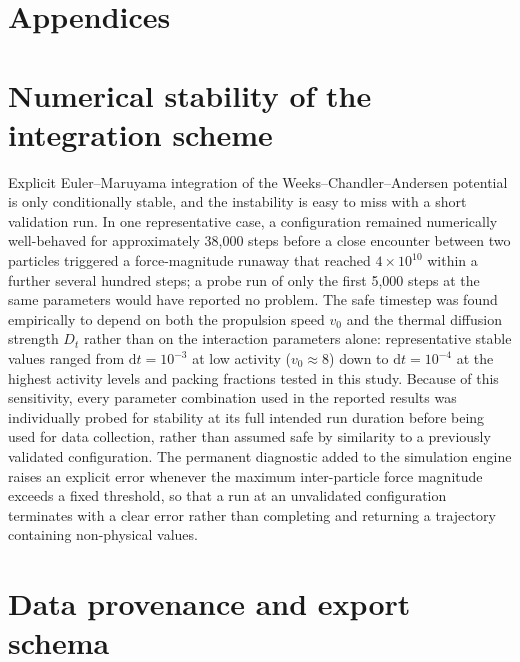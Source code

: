 \documentclass[11pt]{article}
\begin{document}
\newpage
\section*{Appendices}

\appendix

\section{Numerical stability of the integration scheme}
\label{app:stability}

Explicit Euler--Maruyama integration of the Weeks--Chandler--Andersen potential is only conditionally stable, and the instability is easy to miss with a short validation run. In one representative case, a configuration remained numerically well-behaved for approximately 38{,}000 steps before a close encounter between two particles triggered a force-magnitude runaway that reached $4\times10^{10}$ within a further several hundred steps; a probe run of only the first 5{,}000 steps at the same parameters would have reported no problem. The safe timestep was found empirically to depend on both the propulsion speed $v_0$ and the thermal diffusion strength $D_t$ rather than on the interaction parameters alone: representative stable values ranged from $\mathrm{d}t = 10^{-3}$ at low activity ($v_0 \approx 8$) down to $\mathrm{d}t = 10^{-4}$ at the highest activity levels and packing fractions tested in this study. Because of this sensitivity, every parameter combination used in the reported results was individually probed for stability at its full intended run duration before being used for data collection, rather than assumed safe by similarity to a previously validated configuration. The permanent diagnostic added to the simulation engine raises an explicit error whenever the maximum inter-particle force magnitude exceeds a fixed threshold, so that a run at an unvalidated configuration terminates with a clear error rather than completing and returning a trajectory containing non-physical values.

\section{Data provenance and export schema}
\label{app:provenance}
\end{document}
